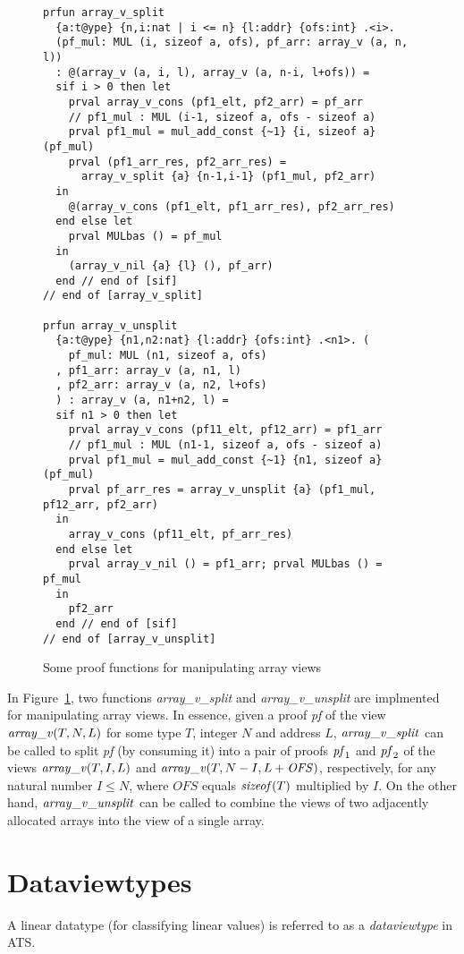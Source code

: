 \begin{figure}
\begin{verbatim}
prfun array_v_split
  {a:t@ype} {n,i:nat | i <= n} {l:addr} {ofs:int} .<i>.
  (pf_mul: MUL (i, sizeof a, ofs), pf_arr: array_v (a, n, l))
  : @(array_v (a, i, l), array_v (a, n-i, l+ofs)) =
  sif i > 0 then let
    prval array_v_cons (pf1_elt, pf2_arr) = pf_arr
    // pf1_mul : MUL (i-1, sizeof a, ofs - sizeof a)
    prval pf1_mul = mul_add_const {~1} {i, sizeof a} (pf_mul)
    prval (pf1_arr_res, pf2_arr_res) =
      array_v_split {a} {n-1,i-1} (pf1_mul, pf2_arr)
  in
    @(array_v_cons (pf1_elt, pf1_arr_res), pf2_arr_res)
  end else let
    prval MULbas () = pf_mul
  in
    (array_v_nil {a} {l} (), pf_arr)
  end // end of [sif]
// end of [array_v_split]

prfun array_v_unsplit
  {a:t@ype} {n1,n2:nat} {l:addr} {ofs:int} .<n1>. (
    pf_mul: MUL (n1, sizeof a, ofs)
  , pf1_arr: array_v (a, n1, l)
  , pf2_arr: array_v (a, n2, l+ofs)
  ) : array_v (a, n1+n2, l) =
  sif n1 > 0 then let
    prval array_v_cons (pf11_elt, pf12_arr) = pf1_arr
    // pf1_mul : MUL (n1-1, sizeof a, ofs - sizeof a)
    prval pf1_mul = mul_add_const {~1} {n1, sizeof a} (pf_mul)
    prval pf_arr_res = array_v_unsplit {a} (pf1_mul, pf12_arr, pf2_arr)
  in
    array_v_cons (pf11_elt, pf_arr_res)
  end else let
    prval array_v_nil () = pf1_arr; prval MULbas () = pf_mul
  in
    pf2_arr
  end // end of [sif]
// end of [array_v_unsplit]
\end{verbatim}
\caption{Some proof functions for manipulating array views}
\label{figure:array_v_split_unsplit.dats}
\end{figure}
In Figure~\ref{figure:array_v_split_unsplit.dats}, two functions {\it
array\_v\_split} and {\it array\_v\_unsplit} are implmented for
manipulating array views. In essence, given a proof {\it pf} of the view
${\it array\_v} (T, N, L)$ for some type $T$, integer $N$ and address $L$,
${\it array\_v\_split}$ can be called to split {\it pf} (by consuming it)
into a pair of proofs ${\it pf}_1$ and ${\it pf}_2$ of the views ${\it
array\_v} (T, I, L)$ and ${\it array\_v} (T, N-I, L+{\it OFS})$, respectively, for
any natural number $I\leq N$, where $OFS$ equals ${\it sizeof}(T)$
multiplied by $I$. On the other hand, ${\it array\_v\_unsplit}$ can be
called to combine the views of two adjacently allocated arrays into the
view of a single array.

\section{Dataviewtypes}
A linear datatype (for classifying linear values) is referred to as a {\it
dataviewtype} in ATS.

